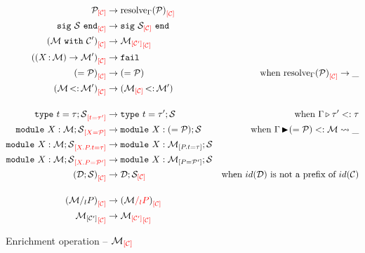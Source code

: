 \begin{align*}
  \Oenrich{\iC}{\iP}
  &\to \Oenrich{\iC}{\resolve{\E}{\iP}}\\
  \Oenrich{\iC}{\Ssig{\iS}}
  &\to \Ssig{\Oenrich{\iC}{\iS}}\\
  \Oenrich{\iC}{(\Swith{\iM}{\iC'})}
  &\to \Oenrich{\iC}{\Oenrich{\iC'}{\iM}}\\
  \Oenrich{\iC}{(\Sfunctor{\ix}{\iM}{\iM'})}
  &\to \texttt{fail}\\
  \Oenrich{\iC}{\Salias{\iP}}
  &\to \Salias{\iP} &\text{when } \Oenrich{\iC}{\resolve{\E}{\iP}}\to \_\\
  \Oenrich{\iC}{\Stransp{\iM}{\iM'}}
  &\to \Stransp{\Oenrich{\iC}{\iM}}{\iM'}\\[4mm]
  \Oenrich{t = \tau'}{\Stype{t}{\tau};\iS}
  &\to \Stype{t}{\tau'};\iS
  &\text{when } \subtyp{\E}{\tau'}{\tau}\\
  \Oenrich{\ix = \iP}{\Smodulety{\ix}{\iM};\iS}
  &\to \Smodulety{\ix}{\Salias{\iP}};\iS
  &\text{when } \submod{\E}{\Salias{\iP}}{\iM}{\_}\\
  \Oenrich{\ix.\ip.t = \tau}{\Smodulety{\ix}{\iM};\iS}
  &\to \Smodulety{\ix}{\Senrich{\ip.t = \tau}{\iM}};\iS\\
  \Oenrich{\ix.\ip = \iP'}{\Smodulety{\ix}{\iM};\iS}
  &\to \Smodulety{\ix}{\Senrich{\ip = \iP'}{\iM}};\iS\\
  \Oenrich{\iC}{(\iD;\iS)}
  &\to \iD;\Oenrich{\iC}{\iS}
  &\text{when } id(\iD) \text{ is not a prefix of } id(\iC)\\[4mm]
  \Oenrich{\iC}{(\Sstrengthen{l}{\ip}{\iM})}
  &\to \Oenrich{\iC}{(\Ostrengthen{l}{\ip}{\iM})}\\
  \Oenrich{\iC}{\Senrich{\iC'}{\iM}}
  &\to \Oenrich{\iC}{\Oenrich{\iC'}{\iM}}\\
\end{align*}\vspace{-3mm}
\caption{Enrichment operation -- $\Oenrich{\iC}{\iM}$}
\label{module:enrich}


